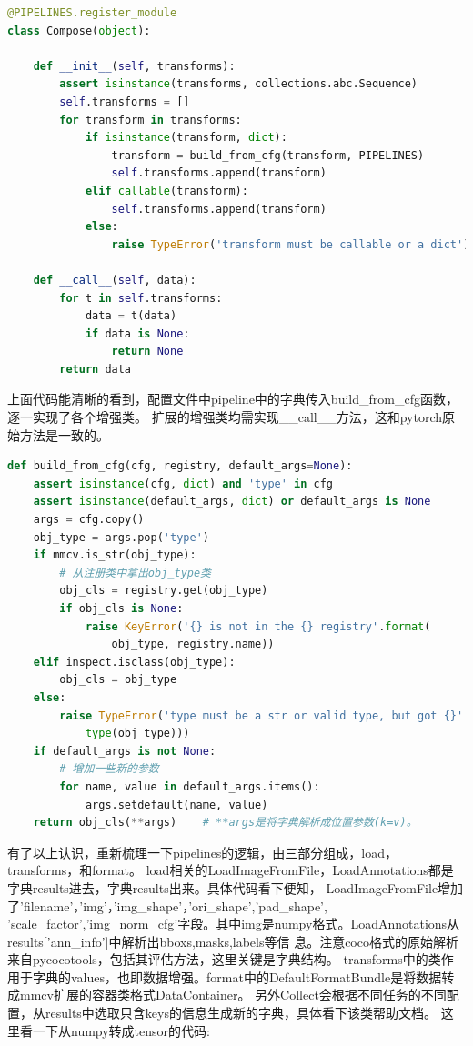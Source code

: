 \documentclass[UTF8]{ctexart}
\begin{document}
\lstset{style=mystyle}
\begin{lstlisting}[language=Python]
@PIPELINES.register_module
class Compose(object):

	def __init__(self, transforms):
		assert isinstance(transforms, collections.abc.Sequence)
		self.transforms = []
		for transform in transforms:
			if isinstance(transform, dict):
				transform = build_from_cfg(transform, PIPELINES)
				self.transforms.append(transform)
			elif callable(transform):
				self.transforms.append(transform)
			else:
				raise TypeError('transform must be callable or a dict')

	def __call__(self, data):
		for t in self.transforms:
			data = t(data)
			if data is None:
				return None
		return data
\end{lstlisting}
上面代码能清晰的看到，配置文件中pipeline中的字典传入build\_from\_cfg函数，逐一实现了各个增强类。
扩展的增强类均需实现\_\_call\_\_方法，这和pytorch原始方法是一致的。

\lstset{style=mystyle}
\begin{lstlisting}[language=Python]
def build_from_cfg(cfg, registry, default_args=None):
	assert isinstance(cfg, dict) and 'type' in cfg
	assert isinstance(default_args, dict) or default_args is None
	args = cfg.copy()
	obj_type = args.pop('type')
	if mmcv.is_str(obj_type):
		# 从注册类中拿出obj_type类
		obj_cls = registry.get(obj_type)
		if obj_cls is None:
			raise KeyError('{} is not in the {} registry'.format(
				obj_type, registry.name))
	elif inspect.isclass(obj_type):
		obj_cls = obj_type
	else:
		raise TypeError('type must be a str or valid type, but got {}'.format(
			type(obj_type)))
	if default_args is not None:
		# 增加一些新的参数
		for name, value in default_args.items():
			args.setdefault(name, value)
	return obj_cls(**args)    # **args是将字典解析成位置参数(k=v)。
\end{lstlisting}

有了以上认识，重新梳理一下pipelines的逻辑，由三部分组成，load，transforms，和format。
load相关的LoadImageFromFile，LoadAnnotations都是字典results进去，字典results出来。具体代码看下便知，
LoadImageFromFile增加了'filename'，'img'，'img\_shape'，'ori\_shape','pad\_shape',
'scale\_factor','img\_norm\_cfg'字段。其中img是numpy格式。LoadAnnotations从results['ann\_info']中解析出bboxs,masks,labels等信
息。注意coco格式的原始解析来自pycocotools，包括其评估方法，这里关键是字典结构。
transforms中的类作用于字典的values，也即数据增强。format中的DefaultFormatBundle是将数据转成mmcv扩展的容器类格式DataContainer。
另外Collect会根据不同任务的不同配置，从results中选取只含keys的信息生成新的字典，具体看下该类帮助文档。
这里看一下从numpy转成tensor的代码:
\end{document}
